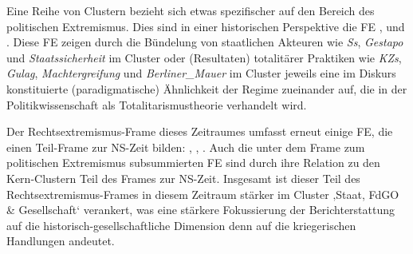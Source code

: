 Eine Reihe von Clustern bezieht sich etwas spezifischer auf den Bereich des politischen Extremismus. Dies sind in einer historischen Perspektive die FE ,  und . Diese FE zeigen durch die Bündelung von staatlichen Akteuren wie \emph{Ss}, \emph{Gestapo} und \emph{Staatssicherheit} im Cluster  oder (Resultaten) totalitärer Praktiken wie \emph{KZs}, \emph{Gulag}, \emph{Machtergreifung} und \emph{Berliner\_Mauer} im Cluster  jeweils eine im Diskurs konstituierte (paradigmatische) Ähnlichkeit der Regime zueinander auf, die in der Politikwissenschaft als Totalitarismustheorie verhandelt wird.

Der Rechtsextremismus-Frame dieses Zeitraumes umfasst erneut einige FE, die einen Teil-Frame zur NS-Zeit bilden: , , . Auch die unter dem Frame zum politischen Extremismus subsummierten FE sind durch ihre Relation zu den Kern-Clustern Teil des Frames zur NS-Zeit. Insgesamt ist dieser Teil des Rechtsextremismus-Frames in diesem Zeitraum stärker im Cluster ‚Staat, FdGO \& Gesellschaft` verankert, was eine stärkere Fokussierung der Berichterstattung auf die historisch-gesellschaftliche Dimension denn auf die kriegerischen Handlungen andeutet.


